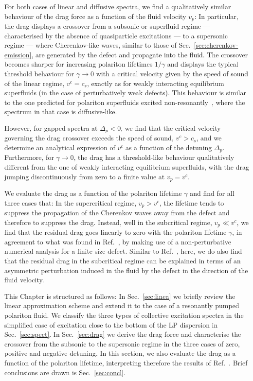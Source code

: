 For both cases of linear and diffusive spectra, we find a
qualitatively similar behaviour of the drag force as a function of the
fluid velocity $v_p$: In particular, the drag displays a crossover
from a subsonic or superfluid regime --- characterised by the absence
of quasiparticle excitations --- to a supersonic regime --- where
Cherenkov-like waves, similar to those of
Sec.~\ref{sec:cherenkov-emission}, are generated by the defect and
propagate into the fluid. The crossover becomes sharper for increasing
polariton lifetimes $1/\gamma$ and displays the typical threshold
behaviour for $\gamma \to 0$ with a critical velocity given by the
speed of sound of the linear regime, $v^c= c_s$, exactly as for weakly
interacting equilibrium superfluids (in the case of perturbatively
weak defects). This behaviour is similar to the one predicted for
polariton superfluids excited non-resonantly~\cite{Wouters_2010},
where the spectrum in that case is diffusive-like.

However, for gapped spectra at $\Delta_p <0$, we find that the
critical velocity governing the drag crossover exceeds the speed of
sound, $v^c > c_s$, and we determine an analytical expression of $v^c$
as a function of the detuning $\Delta_p$. Furthermore, for $\gamma \to 0$,
the drag has a threshold-like behaviour qualitatively different from
the one of weakly interacting equilibrium superfluids, with the drag
jumping discontinuously from zero to a finite value at $v_p=v^c$.

We evaluate the drag as a function of the polariton lifetime $\gamma$
and find for all three cases that: In the supercritical regime,
$v_p>v^c$, the lifetime tends to suppress the propagation of the
Cherenkov waves away from the defect and therefore to suppress the
drag. Instead, well in the subcritical regime, $v_p \ll v^c$, we find
that the residual drag goes linearly to zero with the polariton
lifetime $\gamma$, in agreement to what  was found in
Ref.~\cite{Cancellieri_2010}, by making use of a non-perturbative
numerical analysis for a finite size defect. Similar to
Ref.~\cite{Cancellieri_2010}, here, we do also find that the residual
drag in the subcritical regime can be explained in terms of an
asymmetric perturbation induced in the fluid by the defect in the
direction of the fluid velocity.

This Chapter is structured as follows: In Sec.~\ref{sec:linea} we
briefly review the linear approximation scheme and extend it to the
case of a resonantly pumped polariton fluid. We classify the three
types of collective excitation spectra in the simplified case of
excitation close to the bottom of the LP dispersion in
Sec.~\ref{sec:spect}. In Sec.~\ref{sec:drag} we derive the drag force
and characterise the crossover from the subsonic to the supersonic
regime in the three cases of zero, positive and negative detuning. In
this section, we also evaluate the drag as a function of the polariton
lifetime, interpreting therefore the results of
Ref.~\cite{Cancellieri_2010}.  Brief conclusions are drawn is
Sec.~\ref{sec:concl}.


